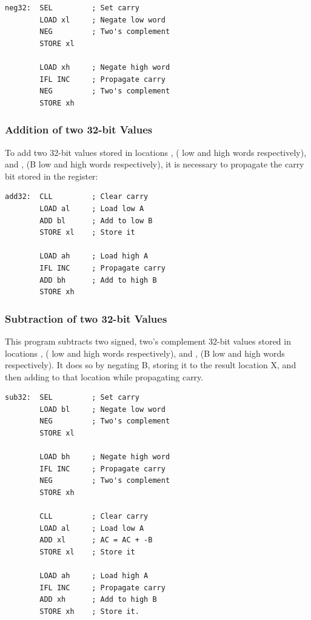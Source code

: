 \begin{lstlisting}[language=cftasm]
neg32:  SEL         ; Set carry
        LOAD xl     ; Negate low word
        NEG         ; Two's complement
        STORE xl

        LOAD xh     ; Negate high word
        IFL INC     ; Propagate carry
        NEG         ; Two's complement
        STORE xh
\end{lstlisting}

\subsubsection{Addition of two 32-bit Values}

To add two 32-bit values stored in locations ,  (\A{} low
and high words respectively), and ,  (B low and high
words respectively), it is necessary to propagate the carry bit
stored in the \Lreg{} register:

\begin{lstlisting}[language=cftasm]
add32:  CLL         ; Clear carry
        LOAD al     ; Load low A
        ADD bl      ; Add to low B
        STORE xl    ; Store it

        LOAD ah     ; Load high A
        IFL INC     ; Propagate carry
        ADD bh      ; Add to high B
        STORE xh
\end{lstlisting}


\subsubsection{Subtraction of two 32-bit Values}

This program subtracts two signed, two's complement 32-bit values
stored in locations ,  (\A{} low and high words
respectively), and ,  (B low and high words
respectively). It does so by negating B, storing it to the result
location X, and then adding \A{} to that location while propagating
carry.

\begin{lstlisting}[language=cftasm]
sub32:  SEL         ; Set carry
        LOAD bl     ; Negate low word
        NEG         ; Two's complement
        STORE xl

        LOAD bh     ; Negate high word
        IFL INC     ; Propagate carry
        NEG         ; Two's complement
        STORE xh

        CLL         ; Clear carry
        LOAD al     ; Load low A
        ADD xl      ; AC = AC + -B
        STORE xl    ; Store it

        LOAD ah     ; Load high A
        IFL INC     ; Propagate carry
        ADD xh      ; Add to high B
        STORE xh    ; Store it.
\end{lstlisting}


